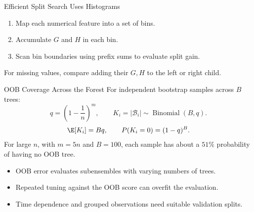 \begin{frame}{Efficient Split Search Uses Histograms}
  \begin{enumerate}\spaceditems
    \item Map each numerical feature into a set of bins.
    \item Accumulate $G$ and $H$ in each bin.
    \item Scan bin boundaries using prefix sums to evaluate split gain.
  \end{enumerate}
  \vspace{.2cm}
  \centering
  \vspace{.3cm}
  \par For missing values, compare adding their $G,H$ to the left or right child.
\end{frame}

\begin{frame}{OOB Coverage Across the Forest}
  For independent bootstrap samples across $B$ trees:
  \[q=\left(1-\frac1n\right)^m,\qquad
    K_i=|\mathcal B_i|\sim\operatorname{Binomial}(B,q).\]
  \[\E[K_i]=Bq,\qquad P(K_i=0)=(1-q)^B.\]
  \pause
  \vspace{.25cm}
  For large $n$, with $m=5n$ and $B=100$, each sample has about a $51\%$ probability of having no OOB tree.
  \vspace{.2cm}
  \begin{itemize}\spaceditems
    \item OOB error evaluates subensembles with varying numbers of trees.
    \item Repeated tuning against the OOB score can overfit the evaluation.
    \item Time dependence and grouped observations need suitable validation splits.
  \end{itemize}
\end{frame}


